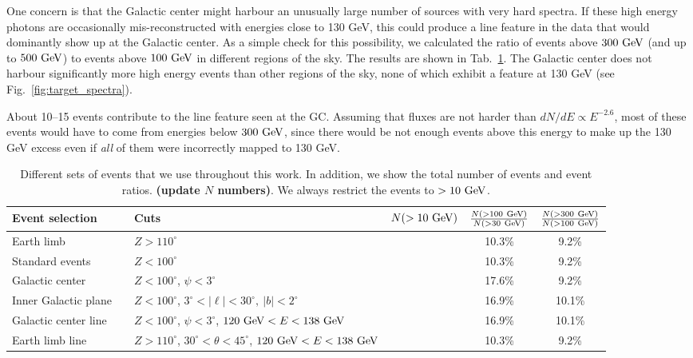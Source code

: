 \documentclass[aps,twocolumn,prd,superscriptaddress,showpacs,nofootinbib,fixfloat]{revtex4}
\newcommand{\GeV}{{\rm ~GeV}}
\begin{document}
One concern is that the Galactic center might harbour an unusually large
number of sources with very hard spectra. If these high energy photons are
occasionally mis-reconstructed with energies close to 130 GeV, this could
produce a line feature in the data that would dominantly show up at the
Galactic center. As a simple check for this possibility, we calculated the
ratio of events above $300\GeV$ (and up to $500\GeV$) to events above
$100\GeV$ in different regions of the sky. The results are shown in
Tab.~\ref{tab:regions}.  The Galactic center does not harbour significantly
more high energy events than other regions of the sky, none of which exhibit a
feature at 130 GeV (see Fig.~\ref{fig:target_spectra}).

About 10--15 events contribute to the line feature seen at the GC. Assuming
that fluxes are not harder than $dN/dE \propto E^{-2.6}$, most of these events
would
have to come from energies below $300\GeV$, since there would be not enough
events above this energy to make up the 130 GeV excess even if \emph{all} of
them were incorrectly mapped to 130 GeV. 


\begin{table}
  \begin{tabular}{lllccc}
    \hline
    Event selection &&Cuts & $N(>10\GeV)$ & $\frac{N(>100\GeV)}{N(>30\GeV)}$ & $\frac{N(>300\GeV)}{N(>100\GeV)}$\\
    \hline
    Earth limb           &  & $Z>110^\circ$                                                  &  & 10.3\% & 9.2\% \\
    Standard events      &  & $Z<100^\circ$                                                  &  & 10.3\% & 9.2\% \\
    Galactic center      &  & $Z<100^\circ$, $\psi<3^\circ$                                  &  & 17.6\% & 9.2\% \\
    Inner Galactic plane &  & $Z<100^\circ$, $3^\circ < |\ell| < 30^\circ,\ |b|<2^\circ$     &  & 16.9\% & 10.1\% \\
    Galactic center line &  & $Z<100^\circ$, $\psi<3^\circ$, $120\GeV<E<138\GeV$             &  & 16.9\% & 10.1\% \\
    Earth limb line      &  & $Z>110^\circ$, $30^\circ<\theta<45^\circ$, $120\GeV<E<138\GeV$ &  & 10.3\% & 9.2\% \\ 
    \hline
  \end{tabular}
  \caption{Different sets of events that we use throughout this work. In
  addition, we show the total number of events and event ratios.
  \textbf{(update $N$ numbers)}. We always restrict the events to $>10\GeV$.}
  \label{tab:regions}
\end{table}
\end{document}
